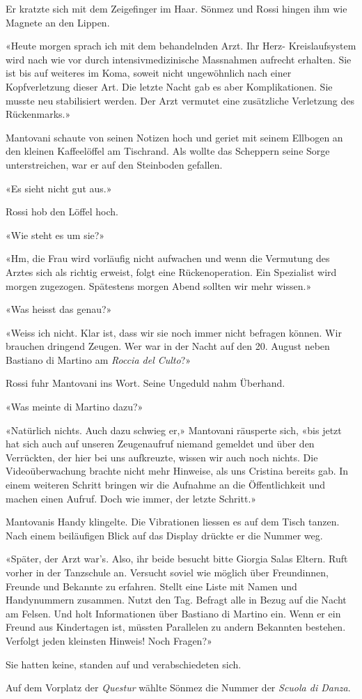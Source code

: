 Er kratzte sich mit dem Zeigefinger im Haar. Sönmez und Rossi hingen ihm
wie Magnete an den Lippen.

«Heute morgen sprach ich mit dem behandelnden Arzt. Ihr Herz-
Kreislaufsystem wird nach wie vor durch intensivmedizinische Massnahmen
aufrecht erhalten. Sie ist bis auf weiteres im Koma, soweit nicht
ungewöhnlich nach einer Kopfverletzung dieser Art. Die letzte Nacht gab
es aber Komplikationen. Sie musste neu stabilisiert werden. Der Arzt
vermutet eine zusätzliche Verletzung des Rückenmarks.»

Mantovani schaute von seinen Notizen hoch und geriet mit seinem Ellbogen
an den kleinen Kaffeelöffel am Tischrand. Als wollte das Scheppern
seine Sorge unterstreichen, war er auf den Steinboden
gefallen.

«Es sieht nicht gut aus.»

Rossi hob den Löffel hoch. 

«Wie steht es um sie?»

«Hm, die Frau wird vorläufig nicht aufwachen und wenn die Vermutung des
Arztes sich als richtig erweist, folgt eine Rückenoperation. Ein
Spezialist wird morgen zugezogen. Spätestens morgen Abend sollten wir
mehr wissen.»

«Was heisst das genau?»

«Weiss ich nicht. Klar ist, dass wir sie noch immer nicht befragen
können. Wir brauchen dringend Zeugen. Wer war in der Nacht auf den 20.
August neben Bastiano di Martino am \emph{Roccia del Culto}?»

Rossi fuhr Mantovani ins Wort. Seine Ungeduld nahm Überhand.

«Was meinte di Martino dazu?»

«Natürlich nichts. Auch dazu schwieg er,» Mantovani
räusperte sich, «bis jetzt hat sich auch auf unseren Zeugenaufruf
niemand gemeldet und über den Verrückten, der hier bei uns aufkreuzte,
wissen wir auch noch nichts. Die Videoüberwachung brachte nicht mehr
Hinweise, als uns Cristina bereits gab. In einem weiteren Schritt
bringen wir die Aufnahme an die Öffentlichkeit und machen einen Aufruf.
Doch wie immer, der letzte Schritt.»

Mantovanis Handy klingelte. Die Vibrationen liessen es auf dem Tisch
tanzen. Nach einem beiläufigen Blick auf das Display drückte er die
Nummer weg.

«Später, der Arzt war’s. Also, ihr beide besucht bitte Giorgia Salas
Eltern. Ruft vorher in der Tanzschule an. Versucht soviel wie möglich
über Freundinnen, Freunde und Bekannte zu erfahren. Stellt eine Liste
mit Namen und Handynummern zusammen. Nutzt den Tag. Befragt alle in
Bezug auf die Nacht am Felsen. Und holt Informationen über Bastiano di
Martino ein. Wenn er ein Freund aus Kindertagen ist, müssten Parallelen
zu andern Bekannten bestehen. Verfolgt jeden kleinsten Hinweis! Noch
Fragen?»
 
Sie hatten keine, standen auf und verabschiedeten sich.

Auf dem Vorplatz der \emph{Questur} wählte Sönmez die Nummer der \emph{Scuola di Danza}.
